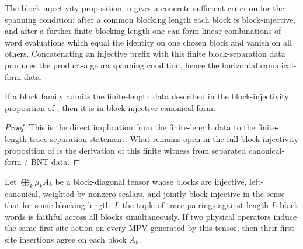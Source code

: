 \begin{remark}
    The block-injectivity proposition in
    \cite[lines~340--345]{Cirac2016MPDO_arXiv} gives a concrete sufficient
    criterion for the spanning condition: after a common blocking length each
    block is block-injective, and after a further finite blocking length one
    can form linear combinations of word evaluations which equal the identity
    on one chosen block and vanish on all others. Concatenating an injective
    prefix with this finite block-separation data produces the product-algebra
    spanning condition, hence the horizontal canonical-form data.
\end{remark}

\begin{theorem}
    \label{thm:propblockinj_abstract}
    \leanok
    If a block family admits the finite-length data described in
    the block-injectivity proposition of
    \cite[lines~340--345]{Cirac2016MPDO_arXiv}, then it is in
    block-injective canonical form.
\end{theorem}

\begin{proof}
    \leanok
    This is the direct implication from the finite-length data to the
    finite-length trace-separation statement. What remains open in the full
    block-injectivity proposition of
    \cite[lines~340--345]{Cirac2016MPDO_arXiv} is the derivation of this
    finite witness from separated canonical-form / BNT data.
\end{proof}

\begin{lemma}
    \label{lem:blockwise_insert_eq_of_mpv_agree}
    \leanok
    Let $\bigoplus_k \mu_k A_k$ be a block-diagonal tensor whose blocks are
    injective, left-canonical, weighted by nonzero scalars, and jointly
    block-injective in the sense that for some blocking length~$L$ the tuple of
    trace pairings against length-$L$ block words is faithful across all blocks
    simultaneously.
    If two physical operators induce the same first-site action on every MPV
    generated by this tensor, then their first-site insertions agree on each
    block $A_k$.
\end{lemma}

